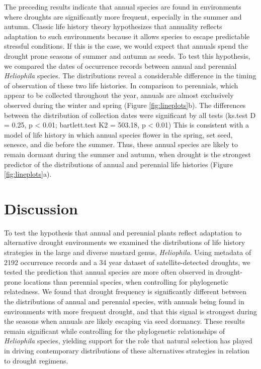 \documentclass[man,floatsintext]{apa6}
\theoremstyle{definition}
\theoremstyle{definition}
\theoremstyle{definition}
\theoremstyle{remark}
\begin{document}
The preceding results indicate that annual species are found in
environments where droughts are significantly more frequent, especially
in the summer and autumn. Classic life history theory hypothesizes that
annuality reflects adaptation to such environments because it allows
species to escape predictable stressful conditions. If this is the case,
we would expect that annuals spend the drought prone seasons of summer
and autumn as seeds. To test this hypothesis, we compared the dates of
occurrence records between annual and perennial \emph{Heliophila}
species. The distributions reveal a considerable difference in the
timing of observation of these two life histories. In comparison to
perennials, which appear to be collected throughout the year, annuals
are almost exclusively observed during the winter and spring (Figure
\ref{fig:lineplots}b). The differences between the distribution of
collection dates were significant by all tests (ks.test D = 0.25, p
\textless{} 0.01; bartlett.test K2 = 503.18, p \textless{} 0.01) This is
consistent with a model of life history in which annual species flower
in the spring, set seed, senesce, and die before the summer. Thus, these
annual species are likely to remain dormant during the summer and
autumn, when drought is the strongest predictor of the distributions of
annual and perennial life histories (Figure \ref{fig:lineplots}a).

\hypertarget{discussion}{%
\section{Discussion}\label{discussion}}

To test the hypothesis that annual and perennial plants reflect
adaptation to alternative drought environments we examined the
distributions of life history strategies in the large and diverse
mustard genus, \emph{Heliophila}. Using metadata of 2192 occurrence
records and a 34 year dataset of satellite-detected droughts, we tested
the prediction that annual species are more often observed in
drought-prone locations than perennial species, when controlling for
phylogenetic relatedness. We found that drought frequency is
significantly different between the distributions of annual and
perennial species, with annuals being found in environments with more
frequent drought, and that this signal is strongest during the seasons
when annuals are likely escaping via seed dormancy. These results remain
significant while controlling for the phylogenetic relationships of
\emph{Heliophila} species, yielding support for the role that natural
selection has played in driving contemporary distributions of these
alternatives strategies in relation to drought regimens.
\end{document}
